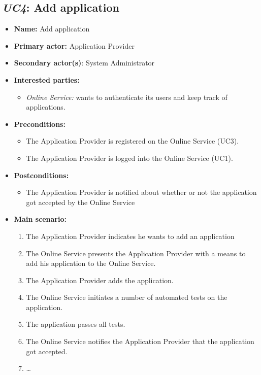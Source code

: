 \documentclass[english]{sareport}
\begin{document}
\subsection{\emph{UC4}: Add application}
\begin{itemize}
    \item \textbf{Name:} Add application
    \item \textbf{Primary actor:} Application Provider
    \item \textbf{Secondary actor(s)}: System Administrator
    \item \textbf{Interested parties:} 
        \begin{itemize}
            \item \textit{Online Service:} wants to authenticate its users and keep track of applications.
        \end{itemize}

    \item \textbf{Preconditions:}
        \begin{itemize}
            \item The Application Provider is registered on the Online Service (UC3).
            \item The Application Provider is logged into the Online Service (UC1).
        \end{itemize}

    \item \textbf{Postconditions:}
        \begin{itemize}
            \item The Application Provider is notified about whether or not the application got accepted by the Online Service
        \end{itemize}
        
    \item \textbf{Main scenario:} 
    \begin{enumerate}
       \item The Application Provider indicates he wants to add an application
       \item The Online Service presents the Application Provider with a means to add his application to the Online Service.
       \item The Application Provider adds the application.
	\item The Online Service initiates a number of automated tests on the application.
	\item The application passes all tests.
	\item The Online Service notifies the Application Provider that the application got accepted.
       \item \ldots
    \end{enumerate}


\end{itemize}
\end{document}

